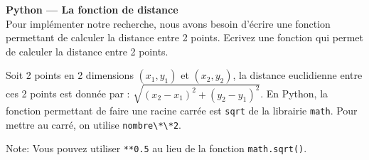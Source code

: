 \begin{Exercice}[5 minutes]\textbf{Python — La fonction de distance}\\

Pour implémenter notre recherche, nous avons besoin d'écrire une fonction permettant de calculer la distance entre 2 points. Ecrivez une fonction qui permet de calculer la distance entre 2 points.\\

\begin{conseil}
    Soit 2 points en 2 dimensions $({x_1},{y_1})$ et $({x_2},{y_2})$, la distance euclidienne entre ces 2 points est donnée par : $\sqrt{(x_2-x_1)^2+(y_2-y_1)^2}$. En Python, la fonction permettant de faire une racine carrée est \lstinline{sqrt} de la librairie \lstinline{math}. Pour mettre au carré, on utilise \lstinline{nombre\*\*2}.
\end{conseil}

\begin{solution}
   
   Note: Vous pouvez utiliser \lstinline{**0.5} au lieu de la fonction \lstinline{math.sqrt()}.
\end{solution}
\end{Exercice}

